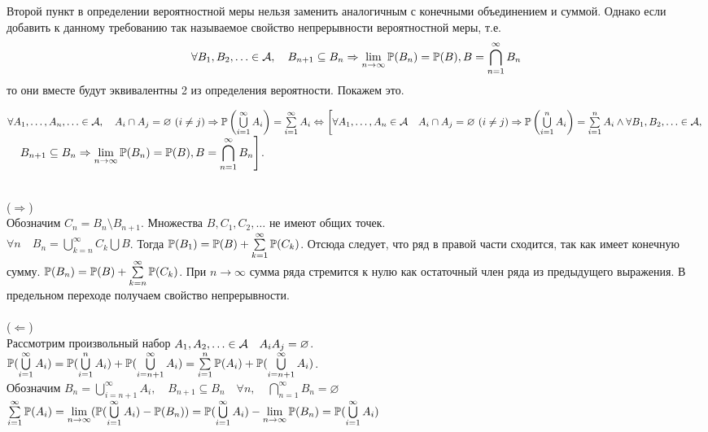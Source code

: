 \documentclass[../TV&MS.tex]{subfiles}
\begin{document}
Второй пункт в определении вероятностной меры нельзя заменить аналогичным с конечными 
объединением и суммой. Однако если добавить к данному требованию так называемое свойство 
непрерывности вероятностной меры, т.е.
$$
	\forall B_1, B_2, \ldots \in \mathcal{A}, \quad B_{n+1} \subseteq B_n 
	\Rightarrow \lim_{n \to \infty} \mathbb{P}(B_n) = \mathbb{P}(B), B = \bigcap_{n=1}^\infty B_n
$$
то они вместе будут эквивалентны 2 из определения вероятности. Покажем это.

\begin{St}
	$\forall A_1, \dots, A_n, \ldots \in \mathcal{A}, \quad A_i \cap A_j  = \varnothing\  (i \neq j)
	\Rightarrow \mathbb{P}\left(\bigcup\limits_{i=1}^{\infty} A_i\right) = \sum\limits_{i = 1}^{\infty} 
	A_i \Leftrightarrow \left[ \forall A_1, \dots, A_n \in \mathcal{A} \quad A_i \cap A_j  = \varnothing\  
	(i \neq j)  \Rightarrow \mathbb{P}\left(\bigcup\limits_{i=1}^{n} A_i\right) = \sum\limits_{i = 1}^{n} 
	A_i  \land  \forall B_1, B_2, \ldots \in \mathcal{A},\right.$ \\ $\left. \quad B_{n+1} \subseteq B_n 
	\Rightarrow \lim\limits_{n \to \infty} \mathbb{P}(B_n) = \mathbb{P}(B), 
	B = \displaystyle\bigcap_{n=1}^\infty B_n\right]$.
\end{St}
\begin{Proof}
\\ ($\Rightarrow$)\\
Обозначим $C_n = B_n \setminus B_{n+1}$. Множества $B, C_1, C_2, \ldots$ не имеют общих точек.\\
$\forall n \quad B_n =  \bigcup\limits_{k=n}^{\infty} C_k \bigcup B$. Тогда $\mathbb{P}(B_1) = \mathbb{P}(B) 
+ \sum\limits_{k=1}^{\infty} \mathbb{P}(C_k)$. Отсюда следует, что ряд в правой части сходится, так как 
имеет конечную сумму. $\mathbb{P}(B_n) = \mathbb{P}(B) + \sum\limits_{k=n}^{\infty} \mathbb{P}(C_k)$. При 
$n \to \infty$ сумма ряда стремится к нулю как остаточный член ряда из предыдущего выражения.
В предельном переходе получаем свойство непрерывности.
\\\\ ($\Leftarrow$)\\
Рассмотрим произвольный набор $A_1, A_2, \ldots \in \mathcal{A} \quad A_iA_j = \varnothing$.\\
$\mathbb{P}(\bigcup\limits_{i=1}^{\infty} A_i) = \mathbb{P}(\bigcup\limits_{i=1}^{n} A_i) + 
\mathbb{P}(\bigcup\limits_{i=n + 1}^{\infty} A_i) =\sum\limits_{i = 1}^{n} \mathbb{P}(A_i) +  
\mathbb{P}(\bigcup\limits_{i=n + 1}^{\infty} A_i) $.\\
Обозначим $B_n = \bigcup\limits_{i=n + 1}^{\infty} A_i,\quad B_{n+1} \subseteq B_n 
\quad \forall n,\quad \bigcap\limits_{n=1}^{\infty} B_n= \varnothing$ \\
$\sum\limits_{i=1}^{\infty} \mathbb{P}(A_i) = \lim\limits_{n \to \infty} 
(\mathbb{P}(\bigcup\limits_{i=1}^{\infty} A_i) - \mathbb{P}(B_n)) = \mathbb{P}(\bigcup\limits_{i=1}^{\infty} A_i) 
- \lim\limits_{n \to \infty} \mathbb{P}(B_n) = \mathbb{P}(\bigcup\limits_{i=1}^{\infty} A_i)$
\end{Proof}
\end{document}
